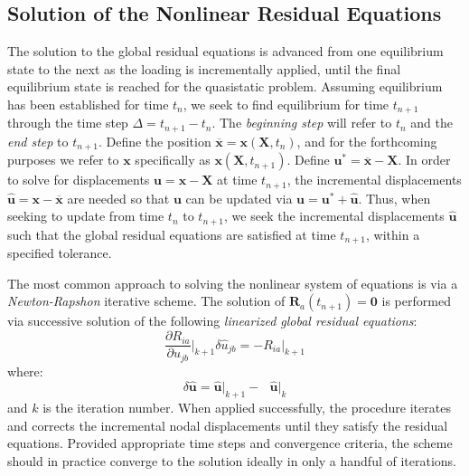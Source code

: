 \subsection{Solution of the Nonlinear Residual Equations}

The solution to the global residual equations is advanced from one equilibrium state to the next as the loading is incrementally applied, until the final equilibrium state is reached for the quasistatic problem. Assuming equilibrium has been established for time $t_n$, we seek to find equilibrium for time $t_{n+1}$ through the time step $\Delta = t_{n+1} - t_{n}$. The \textit{beginning step} will refer to $t_n$ and the \textit{end step} to $t_{n+1}$. Define the position $\overline{\bm{x}} = \bm{x}(\bm{X},t_n)$, and for the forthcoming purposes we refer to ${\bm{x}}$ specifically as $\bm{x}(\bm{X},t_{n+1})$. Define ${\bm{u}}^* = \overline{\bm{x}} - \bm{X}$. In order to solve for displacements $\bm{u} = \bm{x} - \bm{X}$ at time $t_{n+1}$, the incremental displacements $\hat{\bm{u}} = \bm{x} - \overline{\bm{x}}$ are needed so that $\bm{u}$ can be updated via $\bm{u} = {\bm{u}}^* + \hat{\bm{u}}$. Thus, when seeking to update from time $t_n$ to $t_{n+1}$, we seek the incremental displacements $\hat{\bm{u}}$ such that the global residual equations are satisfied at time $t_{n+1}$, within a specified tolerance.

The most common approach to solving the nonlinear system of equations is via a \textit{Newton-Rapshon} iterative scheme. The solution of $\bm{R}_a(t_{n+1}) = \bm{0}$ is performed via successive solution of the following \textit{linearized global residual equations}:
\begin{equation}
\frac{\partial R_{ia}}{\partial \hat{u}_{jb}} \bigg|_{k+1} \delta\hat{u}_{jb} = -R_{ia}\bigg|_{k+1}
\label{eqn:newtonraphson}
\end{equation}
where:
\begin{equation}
\delta\hat{\bm{u}} = \hat{\bm{u}}\big|_{k+1} - \text{\ }\hat{\bm{u}}\big|_k
\end{equation}
and $k$ is the iteration number. When applied successfully, the procedure iterates and corrects the incremental nodal displacements until they satisfy the residual equations. Provided appropriate time steps and convergence criteria, the scheme should in practice converge to the solution ideally in only a handful of iterations.


